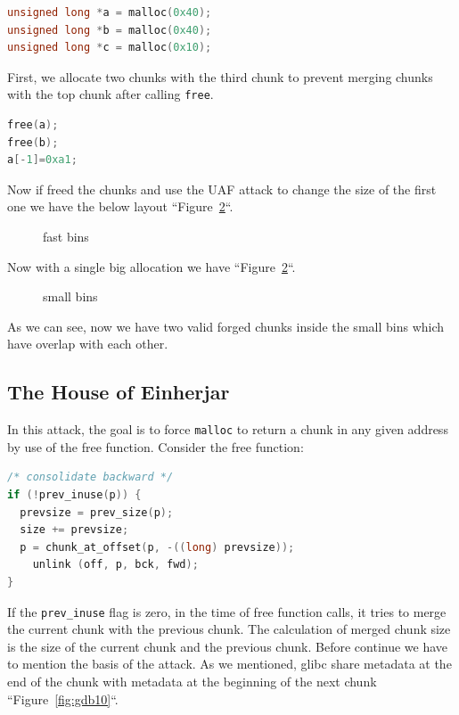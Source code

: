 \documentclass{masterthesis}
\newcommand*\libc{glibc}
\newcommand*\fb{fast bins}
\newcommand*\sbs{small bins}
\newcommand*\mallocc{\lstinline{malloc}\xspace}
\newcommand*\freec{\lstinline{free}\xspace}
\begin{document}
\begin{lstlisting}[language=c,frame=tlrb]
unsigned long *a = malloc(0x40);
unsigned long *b = malloc(0x40);
unsigned long *c = malloc(0x10);
\end{lstlisting}

First, we allocate two chunks with the third chunk to prevent merging chunks with the top chunk after calling \freec{}.

\begin{lstlisting}[language=c,frame=tlrb]
free(a);
free(b);
a[-1]=0xa1;
\end{lstlisting}

Now if freed the chunks and use the UAF attack to change the size of the first one we have the below layout ``Figure~\ref{fig:gdb9}``.

\begin{figure}[h!]
 \caption{\fb{}}
  \label{fig:gdb8}
\end{figure}

Now with a single big allocation we have ``Figure~\ref{fig:gdb9}``.
\begin{figure}[h!]
 \caption{\sbs{}}
  \label{fig:gdb9}
\end{figure}

As we can see, now we have two valid forged chunks inside the \sbs{} which have overlap with each other.

\subsection{The House of Einherjar}
In this attack, the goal is to force \mallocc{} to return a chunk in any given address by use of the free function. Consider the free function:

\begin{lstlisting}[language=c,frame=tlrb]
/* consolidate backward */
if (!prev_inuse(p)) {
  prevsize = prev_size(p);
  size += prevsize;
  p = chunk_at_offset(p, -((long) prevsize));
	unlink (off, p, bck, fwd);
}
 \end{lstlisting}
If the \lstinline{prev_inuse} flag is zero, in the time of free function calls, it tries to merge the current chunk with the previous chunk. The calculation of merged chunk size is the size of the current chunk and the previous chunk. Before continue we have to mention the basis of the attack. As we mentioned, \libc{} share metadata at the end of the chunk with metadata at the beginning of the next chunk ``Figure~\ref{fig:gdb10}``.
\end{document}
